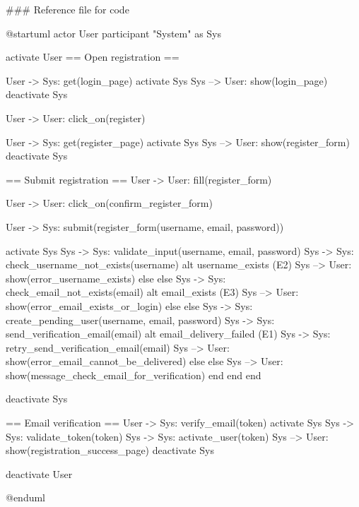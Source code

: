 ### Reference file for code

@startuml
actor User
participant "System" as Sys

activate User
== Open registration ==


User -> Sys: get(login_page)
activate Sys
Sys --> User: show(login_page)
deactivate Sys


User -> User: click_on(register)

User -> Sys: get(register_page)
activate Sys
Sys --> User: show(register_form)
deactivate Sys

== Submit registration ==
User -> User: fill(register_form)

User -> User: click_on(confirm_register_form)

User -> Sys: submit(register_form(username, email, password))

activate Sys
Sys -> Sys: validate_input(username, email, password)
Sys -> Sys: check_username_not_exists(username)
alt username_exists (E2)
    Sys --> User: show(error_username_exists)
else else
    Sys -> Sys: check_email_not_exists(email)
    alt email_exists (E3)
        Sys --> User: show(error_email_exists_or_login)
    else else
        Sys -> Sys: create_pending_user(username, email, password)
        Sys -> Sys: send_verification_email(email)
        alt email_delivery_failed (E1)
            Sys -> Sys: retry_send_verification_email(email)
            Sys --> User: show(error_email_cannot_be_delivered)
        else else
            Sys --> User: show(message_check_email_for_verification)
        end
    end
end

deactivate Sys

== Email verification ==
User -> Sys: verify_email(token)
activate Sys
Sys -> Sys: validate_token(token)
Sys -> Sys: activate_user(token)
Sys --> User: show(registration_success_page)
deactivate Sys

deactivate User

@enduml

